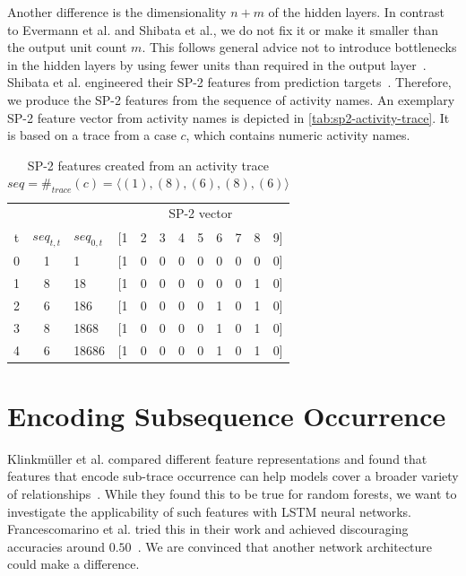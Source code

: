 Another difference is the dimensionality $n+m$ of the hidden layers.
In contrast to Evermann et al. and Shibata et al., we do not fix it or make it smaller than the output unit count $m$.
This follows general advice not to introduce bottlenecks in the hidden layers by using fewer units than required in the output layer~\cite{web:techniques-in-convnets,szegedy2016rethinking}.\\

\noindent Shibata et al. engineered their SP-2 features from prediction targets~\cite{shibata2016bipartite}.
Therefore, we produce the SP-2 features from the sequence of activity names.
An exemplary SP-2 feature vector from activity names is depicted in \autoref{tab:sp2-activity-trace}.
It is based on a trace from a case $c$, which contains numeric activity names.


\begin{table}[!htb]
    \centering
    \begin{adjustbox}{center}
    \begin{tabular}{cclccccccccc}
          &      &              & \multicolumn{9}{c}{SP-2 vector}\\
 t & $seq_{t, t}$ & $seq_{0,t}$ & [1 & 2 & 3 & 4 & 5 & 6 & 7 & 8 & 9]\\
        \midrule
        0 & 1    & 1            & [1 & 0 & 0 & 0 & 0 & 0 & 0 & 0 & 0]\\
        1 & 8    & 18           & [1 & 0 & 0 & 0 & 0 & 0 & 0 & 1 & 0]\\
        2 & 6    & 186          & [1 & 0 & 0 & 0 & 0 & 1 & 0 & 1 & 0]\\
        3 & 8    & 1868         & [1 & 0 & 0 & 0 & 0 & 1 & 0 & 1 & 0]\\
        4 & 6    & 18686        & [1 & 0 & 0 & 0 & 0 & 1 & 0 & 1 & 0]\\
    \end{tabular}
    \end{adjustbox}
    \caption[SP-2 features created from an activity trace]{SP-2 features created from an activity trace $seq=\#_{trace}(c)=\langle (1), (8), (6), (8), (6)\rangle$}
    \label{tab:sp2-activity-trace}
\end{table}


\section{Encoding Subsequence Occurrence}\label{sec:contrib:pfs-inspiration}
Klinkmüller et al. compared different feature representations and found that features that encode sub-trace occurrence can help models cover a broader variety of relationships~\cite{klinkmuller2018reliablemonitoring}.
While they found this to be true for random forests, we want to investigate the applicability of such features with LSTM neural networks.
Francescomarino et al. tried this in their work and achieved discouraging accuracies around $0.50$~\cite{francescomarino2017}.
We are convinced that another network architecture could make a difference.

